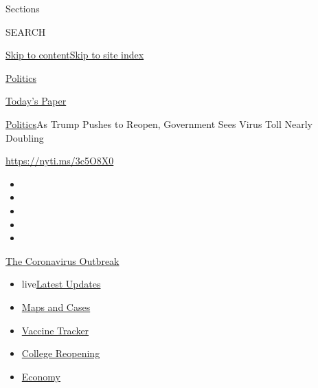 Sections

SEARCH

\protect\hyperlink{site-content}{Skip to
content}\protect\hyperlink{site-index}{Skip to site index}

\href{https://www.nytimes.com/section/politics}{Politics}

\href{https://myaccount.nytimes.com/auth/login?response_type=cookie\&client_id=vi}{}

\href{https://www.nytimes.com/section/todayspaper}{Today's Paper}

\href{/section/politics}{Politics}\textbar{}As Trump Pushes to Reopen,
Government Sees Virus Toll Nearly Doubling

\url{https://nyti.ms/3c5O8X0}

\begin{itemize}
\item
\item
\item
\item
\item
\end{itemize}

\href{https://www.nytimes.com/news-event/coronavirus?action=click\&pgtype=Article\&state=default\&region=TOP_BANNER\&context=storylines_menu}{The
Coronavirus Outbreak}

\begin{itemize}
\tightlist
\item
  live\href{https://www.nytimes.com/2020/08/04/world/coronavirus-cases.html?action=click\&pgtype=Article\&state=default\&region=TOP_BANNER\&context=storylines_menu}{Latest
  Updates}
\item
  \href{https://www.nytimes.com/interactive/2020/us/coronavirus-us-cases.html?action=click\&pgtype=Article\&state=default\&region=TOP_BANNER\&context=storylines_menu}{Maps
  and Cases}
\item
  \href{https://www.nytimes.com/interactive/2020/science/coronavirus-vaccine-tracker.html?action=click\&pgtype=Article\&state=default\&region=TOP_BANNER\&context=storylines_menu}{Vaccine
  Tracker}
\item
  \href{https://www.nytimes.com/2020/08/02/us/covid-college-reopening.html?action=click\&pgtype=Article\&state=default\&region=TOP_BANNER\&context=storylines_menu}{College
  Reopening}
\item
  \href{https://www.nytimes.com/live/2020/08/04/business/stock-market-today-coronavirus?action=click\&pgtype=Article\&state=default\&region=TOP_BANNER\&context=storylines_menu}{Economy}
\end{itemize}

